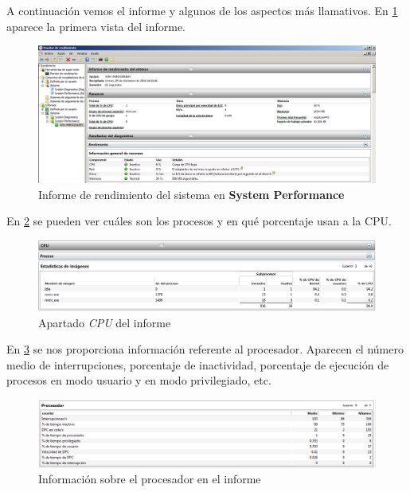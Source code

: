 A continuación vemos el informe y algunos de los aspectos más llamativos.
En \ref{informe-rendimiento} aparece la primera vista del informe.

\begin{figure}[H]
	\centering
	\includegraphics[scale=0.35]{cuestion4-1.png}
	\caption{Informe de rendimiento del sistema en \textbf{System Performance}} \label{informe-rendimiento}
\end{figure}

En \ref{cuestion4-cpuproceso} se pueden ver cuáles son los procesos y en qué porcentaje usan a la CPU.

\begin{figure}[H]
	\centering
	\includegraphics[scale=0.35]{cuestion4-2.png}
	\caption{Apartado \textit{CPU} del informe} \label{cuestion4-cpuproceso}
\end{figure}

En \ref{cuestion4-procesador} se nos proporciona información referente al procesador. Aparecen el número medio de interrupciones, porcentaje de inactividad, porcentaje de ejecución de procesos en modo usuario y en modo privilegiado, etc.

\begin{figure}[H]
	\centering
	\includegraphics[scale=0.35]{cuestion4-3.png}
	\caption{Información sobre el procesador en el informe} \label{cuestion4-procesador}
\end{figure}

